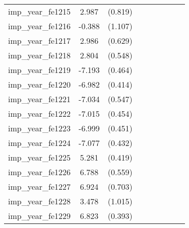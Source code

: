 {\begin{tabular}{l*{4}{cc}}
imp\_year\_fe1215&    2.987\sym{***}&  (0.819)&                  &         &                  &         &                  &         \\
imp\_year\_fe1216&   -0.388         &  (1.107)&                  &         &                  &         &                  &         \\
imp\_year\_fe1217&    2.986\sym{***}&  (0.629)&                  &         &                  &         &                  &         \\
imp\_year\_fe1218&    2.804\sym{***}&  (0.548)&                  &         &                  &         &                  &         \\
imp\_year\_fe1219&   -7.193\sym{***}&  (0.464)&                  &         &                  &         &                  &         \\
imp\_year\_fe1220&   -6.982\sym{***}&  (0.414)&                  &         &                  &         &                  &         \\
imp\_year\_fe1221&   -7.034\sym{***}&  (0.547)&                  &         &                  &         &                  &         \\
imp\_year\_fe1222&   -7.015\sym{***}&  (0.454)&                  &         &                  &         &                  &         \\
imp\_year\_fe1223&   -6.999\sym{***}&  (0.451)&                  &         &                  &         &                  &         \\
imp\_year\_fe1224&   -7.077\sym{***}&  (0.432)&                  &         &                  &         &                  &         \\
imp\_year\_fe1225&    5.281\sym{***}&  (0.419)&                  &         &                  &         &                  &         \\
imp\_year\_fe1226&    6.788\sym{***}&  (0.559)&                  &         &                  &         &                  &         \\
imp\_year\_fe1227&    6.924\sym{***}&  (0.703)&                  &         &                  &         &                  &         \\
imp\_year\_fe1228&    3.478\sym{***}&  (1.015)&                  &         &                  &         &                  &         \\
imp\_year\_fe1229&    6.823\sym{***}&  (0.393)&                  &         &                  &         &                  &         \\

\end{tabular}}
